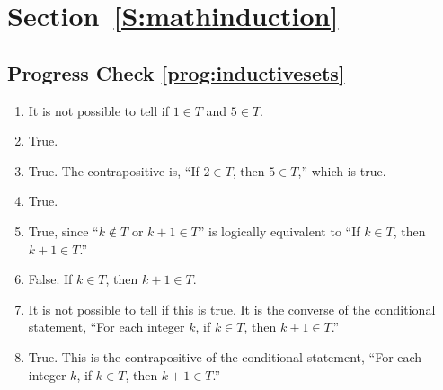 \section*{Section~\ref{S:mathinduction}}

\subsection*{Progress Check \ref{prog:inductivesets}}
\begin{enumerate}
\item It is not possible to tell if $1 \in T$ and $5 \in T$.
\item True.
\item True.  The contrapositive is, ``If $2 \in T$, then $5 \in T$,'' which is true.
\item True.
\item True, since ``$k \notin T$ or $k + 1 \in T$'' is logically equivalent to ``If $k \in T$, then 
$k + 1 \in T$.''
\item False.  If $k \in T$, then $k + 1 \in T$.
\item It is not possible to tell if this is true.  It is the converse of the conditional statement, ``For each integer $k$, if $k \in T$, then $k + 1 \in T$.''
\item True.  This is the contrapositive of the conditional statement, ``For each integer $k$, if $k \in T$, then $k + 1 \in T$.''
\end{enumerate}



